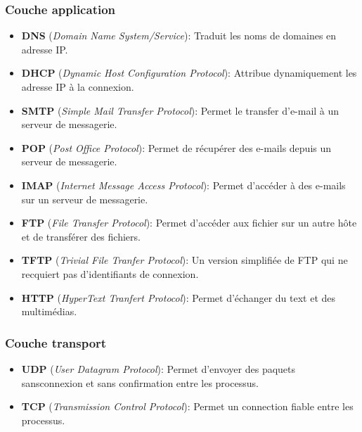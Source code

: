  \subsubsection{Couche application}
 \begin{itemize}
	 \item \textbf{DNS} (\textit{Domain Name System/Service}): Traduit les noms de domaines en adresse IP\@.
	 \item \textbf{DHCP} (\textit{Dynamic Host Configuration Protocol}): Attribue dynamiquement les adresse IP à la connexion.
	 \item \textbf{SMTP} (\textit{Simple Mail Transfer Protocol}): Permet le transfer d'e-mail à un serveur de messagerie.
	 \item \textbf{POP} (\textit{Post Office Protocol}): Permet de récupérer des e-mails depuis un serveur de messagerie.
	 \item \textbf{IMAP} (\textit{Internet Message Access Protocol}): Permet d'accéder à des e-mails sur un serveur de messagerie.
	 \item \textbf{FTP} (\textit{File Transfer Protocol}): Permet d'accéder aux fichier sur un autre hôte et de transférer des fichiers.
	 \item \textbf{TFTP} (\textit{Trivial File Tranfer Protocol}): Un version simplifiée de FTP qui ne recquiert pas d'identifiants de connexion.
	 \item \textbf{HTTP} (\textit{HyperText Tranfert Protocol}): Permet d'échanger du text et des multimédias.
 \end{itemize}

 \subsubsection{Couche transport}
 \begin{itemize}
	 \item \textbf{UDP} (\textit{User Datagram Protocol}): Permet d'envoyer des paquets sansconnexion et sans confirmation entre les processus.
	 \item \textbf{TCP} (\textit{Transmission Control Protocol}): Permet un connection fiable entre les processus.
 \end{itemize}

